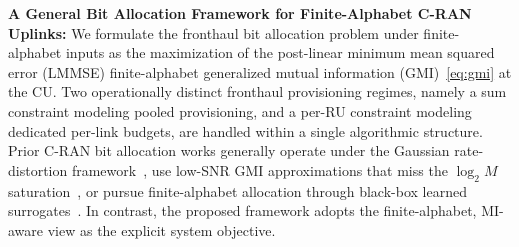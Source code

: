 \documentclass[10pt, twocolumn, comsoc]{IEEEtran}
\begin{document}


{\bf{A General Bit Allocation Framework for Finite-Alphabet C-RAN
Uplinks:}}
We formulate the fronthaul bit allocation problem under finite-alphabet inputs as the maximization of the post-linear minimum mean squared error (LMMSE) finite-alphabet generalized mutual information (GMI)~\eqref{eq:gmi} at the CU.
Two operationally distinct fronthaul provisioning regimes, namely a sum constraint modeling pooled provisioning, and a per-RU constraint modeling dedicated per-link budgets, are handled within a single algorithmic structure. 
Prior C-RAN bit allocation works generally operate under the Gaussian rate-distortion framework~\cite{liu2015optimized, zhang2021quantization}, use low-SNR GMI approximations that miss the $\log_2 M$ saturation~\cite{park2017mixed}, or pursue finite-alphabet allocation through black-box learned surrogates~\cite{chene2024distributed}. 
In contrast, the proposed framework adopts the finite-alphabet, MI-aware view as the explicit system objective.
\end{document}
